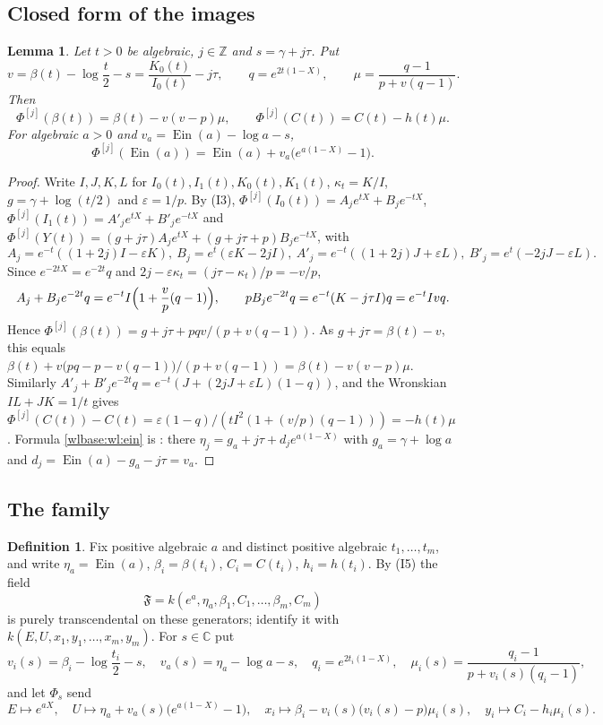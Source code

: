 \documentclass[11pt,a4paper]{article}
\newtheorem{lemma}[theorem]{Lemma}
\theoremstyle{definition}\newtheorem{definition}[theorem]{Definition}
\theoremstyle{remark}\newtheorem{remark}[theorem]{Remark}
\newcommand{\Ein}{\operatorname{Ein}}
\newcommand{\F}{\mathfrak F}\newcommand{\FF}{\mathbb F}
\newcommand{\C}{\mathbb C}\newcommand{\Z}{\mathbb Z}
\begin{document}
\subsection{Closed form of the images}

\begin{lemma}\label{wlbase:wl:closed}
Let $t>0$ be algebraic, $j\in\Z$ and $s=\gamma+j\tau$. Put
\[
 v=\beta(t)-\log\frac t2-s=\frac{K_0(t)}{I_0(t)}-j\tau,\qquad
 q=e^{2t(1-X)},\qquad \mu=\frac{q-1}{p+v(q-1)}.
\]
Then
\begin{equation}\label{wlbase:wl:img}
 \Phi^{[j]}(\beta(t))=\beta(t)-v(v-p)\mu,\qquad
 \Phi^{[j]}(C(t))=C(t)-h(t)\mu .
\end{equation}
For algebraic $a>0$ and $v_a=\Ein(a)-\log a-s$,
\begin{equation}\label{wlbase:wl:ein}
 \Phi^{[j]}(\Ein(a))=\Ein(a)+v_a\bigl(e^{a(1-X)}-1\bigr).
\end{equation}
\end{lemma}

\begin{proof}
Write $I,J,K,L$ for $I_0(t),I_1(t),K_0(t),K_1(t)$, $\kappa_t=K/I$,
$g=\gamma+\log(t/2)$ and $\varepsilon=1/p$. By (I3),
$\Phi^{[j]}(I_0(t))=A_je^{tX}+B_je^{-tX}$,
$\Phi^{[j]}(I_1(t))=A'_je^{tX}+B'_je^{-tX}$ and
$\Phi^{[j]}(Y(t))=(g+j\tau)A_je^{tX}+(g+j\tau+p)B_je^{-tX}$, with
\[
 A_j=e^{-t}((1+2j)I-\varepsilon K),\ B_j=e^t(\varepsilon K-2jI),\
 A'_j=e^{-t}((1+2j)J+\varepsilon L),\ B'_j=e^t(-2jJ-\varepsilon L).
\]
Since $e^{-2tX}=e^{-2t}q$ and $2j-\varepsilon\kappa_t=(j\tau-\kappa_t)/p=-v/p$,
\[
 A_j+B_je^{-2t}q=e^{-t}I\Bigl(1+\frac vp(q-1)\Bigr),\qquad
 pB_je^{-2t}q=e^{-t}(K-j\tau I)q=e^{-t}Ivq .
\]
Hence $\Phi^{[j]}(\beta(t))=g+j\tau+pqv/(p+v(q-1))$. As $g+j\tau=\beta(t)-v$,
this equals $\beta(t)+v\bigl(pq-p-v(q-1)\bigr)/(p+v(q-1))=\beta(t)-v(v-p)\mu$.
Similarly $A'_j+B'_je^{-2t}q=e^{-t}(J+(2jJ+\varepsilon L)(1-q))$, and the
Wronskian $IL+JK=1/t$ gives
$\Phi^{[j]}(C(t))-C(t)=\varepsilon(1-q)/(tI^2(1+(v/p)(q-1)))=-h(t)\mu$.
Formula \eqref{wlbase:wl:ein} is \cite[(dcr:eta-image)]{EB}: there
$\eta_j=g_a+j\tau+d_je^{a(1-X)}$ with $g_a=\gamma+\log a$ and
$d_j=\Ein(a)-g_a-j\tau=v_a$.
\end{proof}

\subsection{The family}

\begin{definition}\label{wlbase:wl:def}
Fix positive algebraic $a$ and distinct positive algebraic $t_1,\dots,t_m$,
and write $\eta_a=\Ein(a)$, $\beta_i=\beta(t_i)$, $C_i=C(t_i)$, $h_i=h(t_i)$.
By (I5) the field
\[
 \F=k(e^a,\eta_a,\beta_1,C_1,\dots,\beta_m,C_m)
\]
is purely transcendental on these generators; identify it with
$k(E,U,x_1,y_1,\dots,x_m,y_m)$. For $s\in\C$ put
\[
 v_i(s)=\beta_i-\log\frac{t_i}2-s,\quad v_a(s)=\eta_a-\log a-s,\quad
 q_i=e^{2t_i(1-X)},\quad \mu_i(s)=\frac{q_i-1}{p+v_i(s)(q_i-1)},
\]
and let $\Phi_s$ send
\[
 E\mapsto e^{aX},\quad U\mapsto\eta_a+v_a(s)\bigl(e^{a(1-X)}-1\bigr),\quad
 x_i\mapsto\beta_i-v_i(s)\bigl(v_i(s)-p\bigr)\mu_i(s),\quad
 y_i\mapsto C_i-h_i\mu_i(s).
\]
\end{definition}
\end{document}
